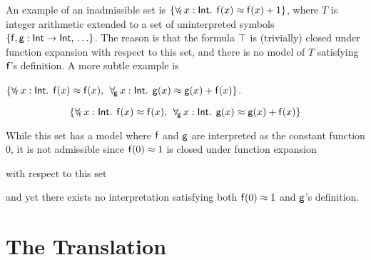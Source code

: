 An example of an inadmissible set is
$\{ \forall_{\!\mathsf{f}\:} x : \mathsf{Int}.\;\, \mathsf{f}( x ) \approx \mathsf{f}( x ) + 1 \}$,
where $T$ is integer arithmetic extended to a set of uninterpreted symbols 
$\{\mathsf{f}, \mathsf{g} :\mathsf{Int} \rightarrow \mathsf{Int},\, \ldots \}$.
The reason is that the formula $\top$ is (trivially) closed under function expansion with respect to this set,
and there is no model of $T$
satisfying $\mathsf{f}$'s definition. A more subtle example is
\begin{shortv}$\{\forall_{\!\mathsf{f}\:} x : \mathsf{Int}.\;\, \mathsf{f}( x ) \approx \mathsf{f}( x ),\allowbreak\;\, \forall_{\!\mathsf{g}\:} x : \mathsf{Int}.\;\, \mathsf{g}( x ) \approx \mathsf{g}( x ) + \nobreak\mathsf{f}( x )\}$. \end{shortv}%
\begin{longv}\[\{\forall_{\!\mathsf{f}\:} x : \mathsf{Int}.\;\, \mathsf{f}( x ) \approx \mathsf{f}( x ),\allowbreak\;\, \forall_{\!\mathsf{g}\:} x : \mathsf{Int}.\;\, \mathsf{g}( x ) \approx \mathsf{g}( x ) + \nobreak\mathsf{f}( x )\}\]\end{longv}%
While this set has a model where $\mathsf{f}$ and $\mathsf{g}$ are interpreted as the
constant function $0$, it is not admissible since %
$\mathsf{f}( 0 ) \approx 1$ is
closed under function expansion \begin{longv}with respect to this set\end{longv}
and yet there exists
no interpretation satisfying both $\mathsf{f}( 0 ) \approx 1$ and $\mathsf{g}$'s
definition.


\section{The Translation}
\label{sec:encoding}

\newcommand{\itemx}{\itemindent6.35em\item}

